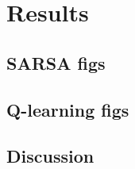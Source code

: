 \graphicspath{{Results/fig}}
\chapter{Results}
\label{chap:Results}

\section{SARSA figs}

\section{Q-learning figs}

\section{Discussion}

